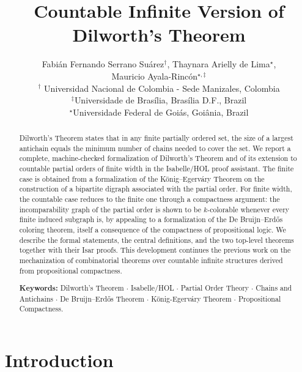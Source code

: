 \documentclass[11pt,a4paper]{article}
\begin{document}
\title{Countable Infinite Version of Dilworth's Theorem}
\author{Fabián Fernando Serrano Suárez$^\dag$,  Thaynara Arielly de Lima$^\star$, \\
Mauricio Ayala-Rincón$^{\star,\ddag}$\\[2mm]
\mbox{}$^\dag$ Universidad Nacional de Colombia - 
Sede Manizales, Colombia \\[1mm]
\mbox{}$^\ddag$Universidade de Brasília, Brasília D.F., Brazil\\[1mm]
\mbox{}$^\star$Universidade Federal de Goiás, Goiânia, Brazil 
 }

\maketitle


\begin{abstract}
Dilworth's Theorem states that in any finite partially ordered set, the size of a
largest antichain equals the minimum number of chains needed to cover the set. We report a complete, machine-checked formalization of Dilworth's Theorem and of
its extension to countable partial orders of finite width in the Isabelle/HOL proof assistant.
The finite case is obtained from a formalization of the K\"onig--Egerv\'ary Theorem on the construction of a bipartite digraph associated with the partial order. For finite width, the countable case reduces to the finite one through a compactness argument: the incomparability graph of the partial order is shown to be $k$-colorable whenever every finite induced subgraph is, by appealing to a formalization of the De Bruijn--Erd\H{o}s coloring theorem, itself a consequence of the compactness of propositional logic. We
describe the formal statements, the central definitions, and the two top-level theorems together with their Isar proofs. This development continues the previous
work on the mechanization of combinatorial theorems over countable infinite structures derived from propositional compactness.

\medskip
\noindent\textbf{Keywords:} Dilworth's Theorem $\cdot$ Isabelle/HOL $\cdot$ Partial Order
Theory $\cdot$ Chains and Antichains $\cdot$ De Bruijn--Erd\H{o}s Theorem $\cdot$
König-Egerváry Theorem $\cdot$
Propositional Compactness.
\end{abstract}

\section{Introduction} \label{sec:Introduction}
\end{document}
